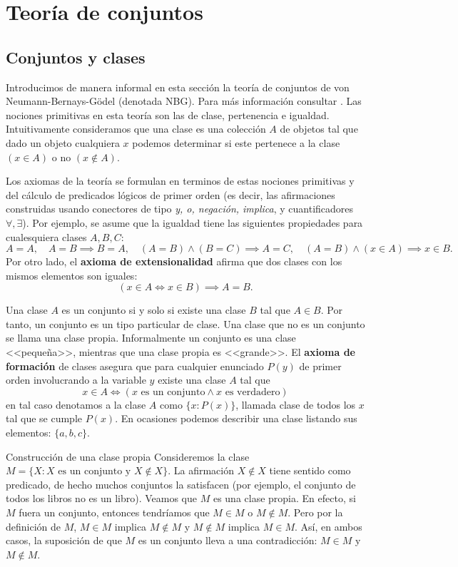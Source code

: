 \appendix
\chapter{Teoría de conjuntos}

\section{Conjuntos y clases}

Introducimos de manera informal en esta sección la teoría de conjuntos de von Neumann-Bernays-Gödel (denotada NBG). Para más información consultar \cite{enwiki:1281064703}. Las nociones primitivas en esta teoría son las de clase, pertenencia e igualdad. Intuitivamente consideramos que una clase es una colección $A$ de objetos tal que dado un objeto cualquiera $x$ podemos determinar si este pertenece a la clase $(x \in A)$ o no $(x \notin A)$.

Los axiomas de la teoría se formulan en terminos de estas nociones primitivas y del cálculo de predicados lógicos de primer orden (es decir, las afirmaciones construidas usando conectores de tipo \textit{y, o, negación, implica}, y cuantificadores $\forall, \exists$). Por ejemplo, se asume que la igualdad tiene las siguientes propiedades para cualesquiera clases $A,B,C$:
\[
A=A,\quad A=B \implies B=A,\quad (A=B) \land (B=C) \implies A=C,\quad (A=B) \land (x \in A) \implies x \in B.
\]
Por otro lado, el \textbf{axioma de extensionalidad} afirma que dos clases con los mismos elementos son iguales:
\[
(x \in A \iff x \in B) \implies A = B.
\]

Una clase $A$ es un conjunto si y solo si existe una clase $B$ tal que $A \in B$. Por tanto, un conjunto es un tipo particular de clase. Una clase que no es un conjunto se llama una clase propia. Informalmente un conjunto es una clase <<pequeña>>, mientras que una clase propia es <<grande>>. El \textbf{axioma de formación} de clases asegura que para cualquier enunciado $P(y)$ de primer orden involucrando a la variable $y$ existe una clase $A$ tal que
\[
x \in A \iff (x \text{ es un conjunto} \land x \text{ es verdadero})
\]
en tal caso denotamos a la clase $A$ como $\{x : P(x)\}$, llamada clase de todos los $x$ tal que se cumple $P(x)$. En ocasiones podemos describir una clase listando sus elementos: $\{a,b,c\}$.

\begin{example}{Construcción de una clase propia}{}
    Consideremos la clase \( M = \{X : X \text{ es un conjunto y } X \notin X\} \). La afirmación \( X \notin X \) tiene sentido como predicado, de hecho muchos conjuntos la satisfacen (por ejemplo, el conjunto de todos los libros no es un libro). Veamos que \( M \) es una clase propia. En efecto, si \( M \) fuera un conjunto, entonces tendríamos que \( M \in M \) o \( M \notin M \). Pero por la definición de \( M \), \( M \in M \) implica \( M \notin M \) y \( M \notin M \) implica \( M \in M \). Así, en ambos casos, la suposición de que \( M \) es un conjunto lleva a una contradicción: \( M \in M \) y \( M \notin M \).
\end{example}

